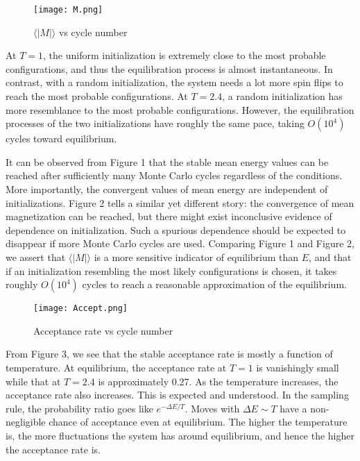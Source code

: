 \documentclass{article}
\begin{document}
\begin{figure}[H]
\begin{center}
\texttt{[image: M.png]}
\caption{$\langle|M|\rangle$ vs cycle number}
\end{center}
\end{figure} 

At $T=1$, the uniform initialization is extremely close to the most probable configurations, and thus the equilibration process is almost instantaneous. In contrast, with a random initialization, the system needs a lot more spin flips to reach the most probable configurations. At $T=2.4$, a random initialization has more resemblance to the most probable configurations. However, the equilibration processes of the two initializations have roughly the same pace, taking $O(10^4)$ cycles toward equilibrium.

It can be observed from Figure 1 that the stable mean energy values can be reached after sufficiently many Monte Carlo cycles regardless of the conditions. More importantly, the convergent values of mean energy are independent of initializations. Figure 2 tells a similar yet different story: the convergence of mean magnetization can be reached, but there might exist inconclusive evidence of dependence on initialization. Such a spurious dependence should be expected to disappear if more Monte Carlo cycles are used. Comparing Figure 1 and Figure 2, we assert that $\langle|M|\rangle$ is a more sensitive indicator of equilibrium than $E$, and that if an initialization resembling the most likely configurations is chosen, it takes roughly $O(10^4)$ cycles to reach a reasonable approximation of the equilibrium.  

\begin{figure}[H]
\begin{center}
\texttt{[image: Accept.png]}
\caption{Acceptance rate vs cycle number}
\end{center}
\end{figure}

From Figure 3, we see that the stable acceptance rate is mostly a function of temperature. At equilibrium, the acceptance rate at $T=1$ is vanishingly small while that at $T=2.4$ is approximately 0.27. As the temperature increases, the acceptance rate also increases. This is expected and understood. In the sampling rule, the probability ratio goes like $e^{-\Delta E/T}$. Moves with $\Delta E \sim T$ have a non-negligible chance of acceptance even at equilibrium. The higher the temperature is, the more fluctuations the system has around equilibrium, and hence the higher the acceptance rate is.
\end{document}
